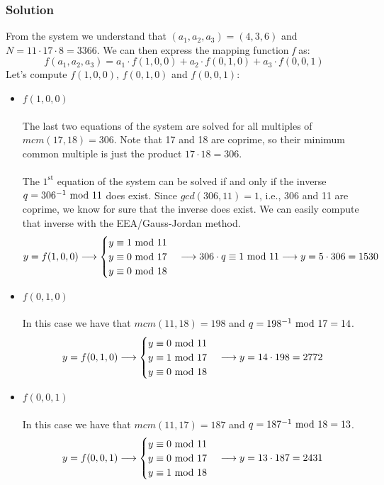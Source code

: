 \subsubsection*{Solution}
From the system we understand that $(a_1,a_2,a_3)=(4,3,6)$ and $N=11\cdot17\cdot8=3366$. We can then express the mapping function \textit{f} as:
$$f(a_1,a_2,a_3)=a_1\cdot f(1,0,0)+a_2\cdot f(0,1,0)+a_3\cdot f(0,0,1)$$
Let's compute $f(1,0,0)$, $f(0,1,0)$ and $f(0,0,1)$:
\begin{itemize}
    \item $f(1,0,0)$\\\\The last two equations of the system are solved for all multiples of $mcm(17,18)=306$. Note that 17 and 18 are coprime, so their minimum common multiple is just the product $17\cdot18=306$.\\\\
    The $1^{\text{st}}$ equation of the system can be solved if and only if the inverse $q=306^{-1}\text{ mod }11$ does exist. Since $gcd(306, 11)=1$, i.e., 306 and 11 are coprime, we know for sure that the inverse does exist. We can easily compute that inverse with the EEA/Gauss-Jordan method.
    \begin{equation*}
        y=f(1,0,0)\longrightarrow
        \begin{cases}
            y\equiv1\text{ mod }11\\
            y\equiv0\text{ mod }17\\
            y\equiv0\text{ mod }18
        \end{cases}\longrightarrow
        306\cdot q\equiv1\text{ mod }11
        \longrightarrow y=5\cdot306=1530
    \end{equation*}
    \item $f(0,1,0)$\\\\In this case we have that $mcm(11,18)=198$ and $q=198^{-1}\text{ mod }17=14$.
    \begin{equation*}
        y=f(0,1,0)\longrightarrow
        \begin{cases}
            y\equiv0\text{ mod }11\\
            y\equiv1\text{ mod }17\\
            y\equiv0\text{ mod }18
        \end{cases}
        \longrightarrow y=14\cdot198=2772
    \end{equation*}
    \item $f(0,0,1)$\\\\In this case we have that $mcm(11,17)=187$ and $q=187^{-1}\text{ mod }18=13$.
    \begin{equation*}
        y=f(0,0,1)\longrightarrow
        \begin{cases}
            y\equiv0\text{ mod }11\\
            y\equiv0\text{ mod }17\\
            y\equiv1\text{ mod }18
        \end{cases}
        \longrightarrow y=13\cdot187=2431
    \end{equation*}
\end{itemize}
